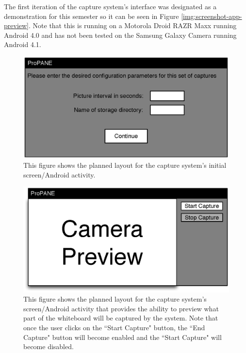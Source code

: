 \documentclass[]{article}
\begin{document}
					The first iteration of the capture system's interface was designated as a demonstration for this semester so it can be seen in Figure \ref{img:screenshot-app-preview}. Note that this is running on a Motorola Droid RAZR Maxx running Android 4.0 and has not been tested on the Samsung Galaxy Camera running Android 4.1. 
									
					\begin{figure}
						\centering
						\includegraphics{images/app-main-layout.eps}
						\caption{This figure shows the planned layout for the capture system's initial screen/Android activity.}
						\label{img:app-main-layout}
					\end{figure}
					
					\begin{figure}
						\centering
						\includegraphics{images/app-preview-layout.eps}
						\caption{This figure shows the planned layout for the capture system's screen/Android activity that provides the ability to preview what part of the whiteboard will be captured by the system. Note that once the user clicks on the ``Start Capture" button, the ``End Capture" button will become enabled and the ``Start Capture" will become disabled.}
						\label{img:app-preview-layout}
					\end{figure}
					
\end{document}
